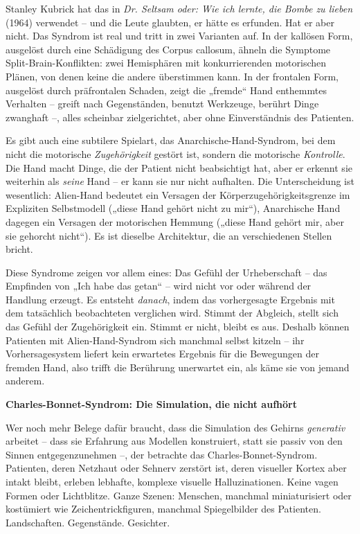 \documentclass[11pt, twoside, openright]{book}
\begin{document}
Stanley Kubrick hat das in \textit{Dr. Seltsam oder: Wie ich lernte, die Bombe zu lieben} (1964) verwendet -- und die Leute glaubten, er hätte es erfunden. Hat er aber nicht. Das Syndrom ist real und tritt in zwei Varianten auf. In der kallösen Form, ausgelöst durch eine Schädigung des Corpus callosum, ähneln die Symptome Split-Brain-Konflikten: zwei Hemisphären mit konkurrierenden motorischen Plänen, von denen keine die andere überstimmen kann. In der frontalen Form, ausgelöst durch präfrontalen Schaden, zeigt die „fremde“ Hand enthemmtes Verhalten -- greift nach Gegenständen, benutzt Werkzeuge, berührt Dinge zwanghaft --, alles scheinbar zielgerichtet, aber ohne Einverständnis des Patienten.

Es gibt auch eine subtilere Spielart, das Anarchische-Hand-Syndrom, bei dem nicht die motorische \textit{Zugehörigkeit} gestört ist, sondern die motorische \textit{Kontrolle}. Die Hand macht Dinge, die der Patient nicht beabsichtigt hat, aber er erkennt sie weiterhin als \textit{seine} Hand -- er kann sie nur nicht aufhalten. Die Unterscheidung ist wesentlich: Alien-Hand bedeutet ein Versagen der Körperzugehörigkeitsgrenze im Expliziten Selbstmodell („diese Hand gehört nicht zu mir“), Anarchische Hand dagegen ein Versagen der motorischen Hemmung („diese Hand gehört mir, aber sie gehorcht nicht“). Es ist dieselbe Architektur, die an verschiedenen Stellen bricht.

Diese Syndrome zeigen vor allem eines: Das Gefühl der Urheberschaft -- das Empfinden von „Ich habe das getan“ -- wird nicht vor oder während der Handlung erzeugt. Es entsteht \textit{danach}, indem das vorhergesagte Ergebnis mit dem tatsächlich beobachteten verglichen wird. Stimmt der Abgleich, stellt sich das Gefühl der Zugehörigkeit ein. Stimmt er nicht, bleibt es aus. Deshalb können Patienten mit Alien-Hand-Syndrom sich manchmal selbst kitzeln -- ihr Vorhersagesystem liefert kein erwartetes Ergebnis für die Bewegungen der fremden Hand, also trifft die Berührung unerwartet ein, als käme sie von jemand anderem.

\textbf{Charles-Bonnet-Syndrom: Die Simulation, die nicht aufhört}

Wer noch mehr Belege dafür braucht, dass die Simulation des Gehirns \textit{generativ} arbeitet -- dass sie Erfahrung aus Modellen konstruiert, statt sie passiv von den Sinnen entgegenzunehmen --, der betrachte das Charles-Bonnet-Syndrom. Patienten, deren Netzhaut oder Sehnerv zerstört ist, deren visueller Kortex aber intakt bleibt, erleben lebhafte, komplexe visuelle Halluzinationen. Keine vagen Formen oder Lichtblitze. Ganze Szenen: Menschen, manchmal miniaturisiert oder kostümiert wie Zeichentrickfiguren, manchmal Spiegelbilder des Patienten. Landschaften. Gegenstände. Gesichter.
\end{document}
